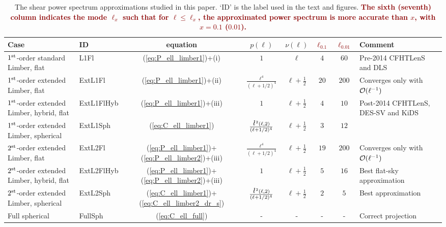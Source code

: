 \documentclass[fleqn,usenatbib]{mnras} %
\newcommand{\ellbar}{\hbox{\it \l}\,}
\newcommand{\forref}[1]{{\bf\textcolor{darkred}{#1}}}
\begin{document}
\renewcommand{\baselinestretch}{1.5}
\begin{table}
\begin{centering}
  \caption{\label{tab:cases}The shear power spectrum approximations studied in this paper. `ID' is the label
    used in the text and figures.
    \forref{The sixth (seventh) column indicates the mode $\ell_x$ such that for $\ell \leq \ell_x$, the approximated
    power spectrum is more accurate than $x$, with $x=0.1$ ($0.01$).}
    } 
    \begin{tabular}{|p{}|l|c|c|c|c|c|p{}}
  \hline
  Case & ID & equation & $p(\ell)$ & $\nu(\ell)$ & \forref{$\ell_{0.1}$} & \forref{$\ell_{0.01}$} & Comment \\ \hline
  $1^{\rm st}$-order standard Limber, flat & L1Fl & (\ref{eq:P_ell_limber1})+(i)
    & $1$ & $\ell$ & $4$ & $60$ & Pre-2014 CFHTLenS and DLS \\ \hline
  $1^{\rm st}$-order extended Limber, flat & ExtL1Fl & (\ref{eq:P_ell_limber1})+(ii)
    & $\frac{\ell^4}{(\ell+1/2)^4}$ & $\ell + \frac 1 2$ & $20$ & $200$ & Converges only with ${\cal O}(\ell^{-1})$ \\ \hline
  $1^{\rm st}$-order extended Limber, hybrid, flat & ExtL1FlHyb & (\ref{eq:P_ell_limber1})+(iii)
    & $1$ & $\ell + \frac 1 2$ & $4$ & $10$ & Post-2014 CFHTLenS, DES-SV and KiDS \\ \hline
  $1^{\rm st}$-order extended Limber, spherical & ExtL1Sph & (\ref{eq:C_ell_limber1})
    & $\frac{\ellbar^2(\ell, 2)}{(\ell+1/2)^4}$ & $\ell+ \frac 1 2$ & $3$ & $12$ & \\ \hline
  $2^{\rm st}$-order extended Limber, flat & ExtL2Fl &  (\ref{eq:P_ell_limber1})+(\ref{eq:P_ell_limber2})+(iii)
    & $\frac{\ell^4}{(\ell+1/2)^4}$ 
    & $\ell+\frac 1 2$ & $19$ & $200$ & Converges only with ${\cal O}(\ell^{-1})$ \\ \hline
  $2^{\rm st}$-order extended Limber, hybrid, flat & ExtL2FlHyb &  (\ref{eq:P_ell_limber1})+(\ref{eq:P_ell_limber2})+(iii)
    & $1$ 
    & $\ell+ \frac 1 2$ & $5$ & $16$ & Best flat-sky approximation \\ \hline
  $2^{\rm st}$-order extended Limber, spherical & ExtL2Sph & (\ref{eq:C_ell_limber1})+(\ref{eq:C_ell_limber2_dr_s})
    & $\frac{\ellbar^2(\ell, 2)}{(\ell+1/2)^4}$ & $\ell+\frac 1 2$ & $2$ & $5$ & Best approximation \\ \hline
  Full spherical & FullSph & (\ref{eq:C_ell_full}) &
      - & - & - & - & Correct projection \\ \hline
  \end{tabular}

\end{centering}
\end{table}
\renewcommand{\baselinestretch}{1}
\end{document}
